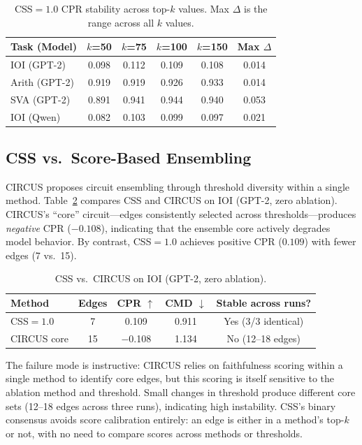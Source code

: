 \documentclass[11pt,a4paper]{article}
\newcommand{\css}{\textsc{CSS}}
\begin{document}
\begin{table}[t]
\centering
\small
\caption{\css{}$=1.0$ CPR stability across top-$k$ values. Max $\Delta$ is the range across all $k$ values.}
\label{tab:ksweep}
\begin{tabular}{@{}lccccc@{}}
\toprule
Task (Model) & $k$=50 & $k$=75 & $k$=100 & $k$=150 & Max $\Delta$ \\
\midrule
IOI (GPT-2) & 0.098 & 0.112 & 0.109 & 0.108 & 0.014 \\
Arith (GPT-2) & 0.919 & 0.919 & 0.926 & 0.933 & 0.014 \\
SVA (GPT-2) & 0.891 & 0.941 & 0.944 & 0.940 & 0.053 \\
IOI (Qwen) & 0.082 & 0.103 & 0.099 & 0.097 & 0.021 \\
\bottomrule
\end{tabular}
\end{table}

\subsection{CSS vs.\ Score-Based Ensembling}
\label{sec:circus}

CIRCUS \cite{parekh2026circus} proposes circuit ensembling through threshold diversity within a single method.
Table~\ref{tab:circus} compares \css{} and CIRCUS on IOI (GPT-2, zero ablation).
CIRCUS's ``core'' circuit---edges consistently selected across thresholds---produces \emph{negative} CPR ($-0.108$), indicating that the ensemble core actively degrades model behavior.
By contrast, \css{}$=1.0$ achieves positive CPR ($0.109$) with fewer edges (7 vs.\ 15).

\begin{table}[t]
\centering
\small
\caption{\css{} vs.\ CIRCUS on IOI (GPT-2, zero ablation).}
\label{tab:circus}
\begin{tabular}{@{}lcccc@{}}
\toprule
Method & Edges & CPR $\uparrow$ & CMD $\downarrow$ & Stable across runs? \\
\midrule
\css{}$=1.0$ & 7 & 0.109 & 0.911 & Yes (3/3 identical) \\
CIRCUS core & 15 & $-$0.108 & 1.134 & No (12--18 edges) \\
\bottomrule
\end{tabular}
\end{table}

The failure mode is instructive: CIRCUS relies on faithfulness scoring within a single method to identify core edges, but this scoring is itself sensitive to the ablation method and threshold.
Small changes in threshold produce different core sets (12--18 edges across three runs), indicating high instability.
\css{}'s binary consensus avoids score calibration entirely: an edge is either in a method's top-$k$ or not, with no need to compare scores across methods or thresholds.
\end{document}
